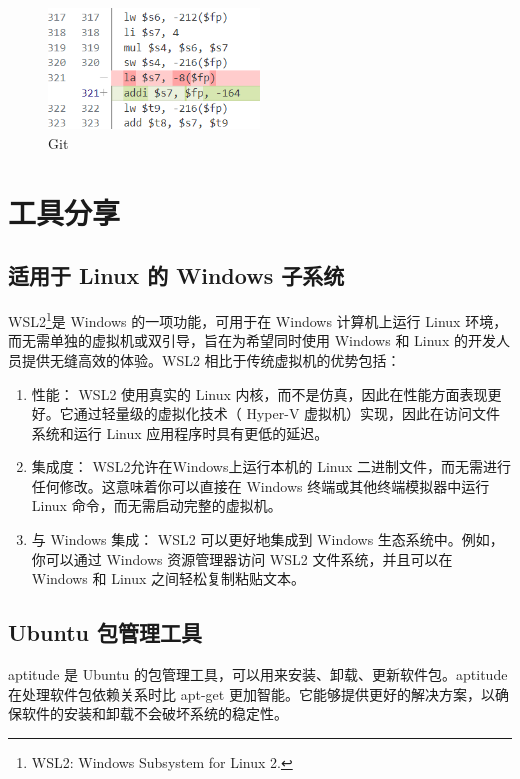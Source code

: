 \documentclass{article}
\begin{document}
\begin{figure}[h]
    \centering
    \includegraphics[width=0.5\textwidth]{../lab04-object-code-generation/pic/image-20231216110014714.png}
    \caption{Git}
    \label{fig:Git}
\end{figure}

\section{工具分享}

\subsection{适用于 Linux 的 Windows 子系统}

WSL2\footnote{WSL2: Windows Subsystem for Linux 2.}是 Windows 的一项功能，可用于在 Windows 计算机上运行 Linux 环境，而无需单独的虚拟机或双引导，旨在为希望同时使用 Windows 和 Linux 的开发人员提供无缝高效的体验。WSL2 相比于传统虚拟机的优势包括：
\begin{enumerate}
    \item 性能： WSL2 使用真实的 Linux 内核，而不是仿真，因此在性能方面表现更好。它通过轻量级的虚拟化技术（ Hyper-V 虚拟机）实现，因此在访问文件系统和运行 Linux 应用程序时具有更低的延迟。
    \item 集成度： WSL2允许在Windows上运行本机的 Linux 二进制文件，而无需进行任何修改。这意味着你可以直接在 Windows 终端或其他终端模拟器中运行 Linux 命令，而无需启动完整的虚拟机。
    \item 与 Windows 集成： WSL2 可以更好地集成到 Windows 生态系统中。例如，你可以通过 Windows 资源管理器访问 WSL2 文件系统，并且可以在 Windows 和 Linux 之间轻松复制粘贴文本。
\end{enumerate}

\subsection{Ubuntu 包管理工具}
aptitude 是 Ubuntu 的包管理工具，可以用来安装、卸载、更新软件包。aptitude 在处理软件包依赖关系时比 apt-get 更加智能。它能够提供更好的解决方案，以确保软件的安装和卸载不会破坏系统的稳定性。
\end{document}
